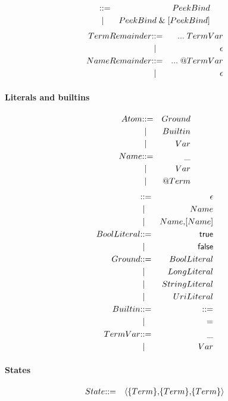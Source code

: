 \begin{eqnarray*}
  [PeekBind] & \bc & PeekBind \\
  & \;\bm \; & PeekBind \; \mathsf{\&}\; [PeekBind]
\end{eqnarray*}
\begin{eqnarray*}
  TermRemainder & \mathbin{\mathbf{::=}} & \mathsf{...} \; TermVar \\
 & \;\mathbin{\mathbf\mid} \; & \epsilon \\
  NameRemainder & \mathbin{\mathbf{::=}} & \mathsf{...} \; \mathsf{@} TermVar \\
& \;\mathbin{\mathbf\mid} \; & \epsilon
\end{eqnarray*}

\paragraph{Literals and builtins}
\begin{eqnarray*}
  Atom & \mathbin{\mathbf{::=}} & Ground \\
  & \;\mathbin{\mathbf\mid} \; & Builtin \\
  & \;\mathbin{\mathbf\mid} \; & Var \\
  Name & \mathbin{\mathbf{::=}} & \mathsf{\_} \\
  & \;\mathbin{\mathbf\mid} \; & Var \\
  & \;\mathbin{\mathbf\mid} \; & \mathsf{@} Term
\end{eqnarray*}
\begin{eqnarray*}  
  [Name] & \bc & \epsilon \\
  & \;\bm \; & Name \\
  & \;\bm \; & Name \mathsf{,} [Name] \\
  BoolLiteral & \bc & \mathsf{true} \\
 & \;\bm \; & \mathsf{false} \\
  Ground & \bc & BoolLiteral \\
  & \;\bm \; & LongLiteral \\
  & \;\bm \; & StringLiteral \\
  & \;\bm \; & UriLiteral \\
  Builtin & \bc & \mathsf{\bc} \\
  & \;\bm \; & \mathsf{=} \\
  TermVar & \bc & \mathsf{\_} \\
  & \;\bm \; & Var \\
\end{eqnarray*}

\paragraph{States}
\begin{eqnarray*}
  State & \mathbin{\mathbf{::=}} & \langle \mathsf{\{}Term\mathsf{\}} \mathsf{,} \mathsf{\{}Term\mathsf{\}} \mathsf{,} \mathsf{\{}Term\mathsf{\}} \rangle
\end{eqnarray*}

